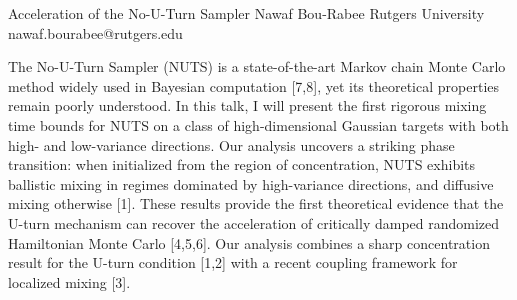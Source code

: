 \begin{talk}
  {Acceleration of the No-U-Turn Sampler}%
  {Nawaf Bou-Rabee}%
  {Rutgers University}%
  {nawaf.bourabee@rutgers.edu}%
  {}%
  
    
   

\medskip

The No-U-Turn Sampler (NUTS) is a state-of-the-art Markov chain Monte Carlo method widely used in Bayesian computation [7,8], yet its theoretical properties remain poorly understood. In this talk, I will present the first rigorous mixing time bounds for NUTS on a class of high-dimensional Gaussian targets with both high- and low-variance directions. Our analysis uncovers a striking phase transition: when initialized from the region of concentration, NUTS exhibits ballistic mixing in regimes dominated by high-variance directions, and diffusive mixing otherwise [1]. These results provide the first theoretical evidence that the U-turn mechanism can recover the acceleration of critically damped randomized Hamiltonian Monte Carlo [4,5,6].  Our analysis combines a sharp concentration result for the U-turn condition [1,2] with a recent coupling framework for localized mixing [3]. 


\end{talk}
